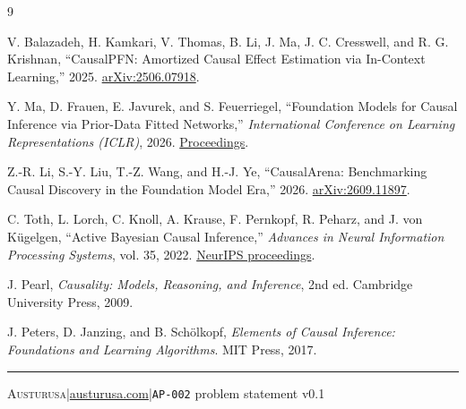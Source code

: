 \documentclass[11pt]{article}
\newcommand{\Austurusa}{\textsc{Austurusa}}
\newcommand{\codeid}[1]{\texttt{#1}}
\begin{document}
\begin{thebibliography}{9}

V. Balazadeh, H. Kamkari, V. Thomas, B. Li, J. Ma, J. C. Cresswell, and R. G. Krishnan,
``CausalPFN: Amortized Causal Effect Estimation via In-Context Learning,'' 2025.
\href{https://arxiv.org/abs/2506.07918}{arXiv:2506.07918}.

Y. Ma, D. Frauen, E. Javurek, and S. Feuerriegel,
``Foundation Models for Causal Inference via Prior-Data Fitted Networks,''
\emph{International Conference on Learning Representations (ICLR)}, 2026.
\href{https://proceedings.iclr.cc/paper_files/paper/2026/hash/7f8cabaf2de70e1a9d3eb187f02bd58c-Abstract-Conference.html}{Proceedings}.

Z.-R. Li, S.-Y. Liu, T.-Z. Wang, and H.-J. Ye,
``CausalArena: Benchmarking Causal Discovery in the Foundation Model Era,'' 2026.
\href{https://arxiv.org/abs/2609.11897}{arXiv:2609.11897}.

C. Toth, L. Lorch, C. Knoll, A. Krause, F. Pernkopf, R. Peharz, and J. von K\"ugelgen,
``Active Bayesian Causal Inference,''
\emph{Advances in Neural Information Processing Systems}, vol. 35, 2022.
\href{https://papers.nips.cc/paper_files/paper/2022/hash/675e371eeeea99551ce47797ed6ed33e-Abstract-Conference.html}{NeurIPS proceedings}.

J. Pearl,
\emph{Causality: Models, Reasoning, and Inference}, 2nd ed.
Cambridge University Press, 2009.

J. Peters, D. Janzing, and B. Sch\"olkopf,
\emph{Elements of Causal Inference: Foundations and Learning Algorithms}.
MIT Press, 2017.

\end{thebibliography}

\vfill
\rule{\textwidth}{0.4pt}
{\small\color{muted}
\Austurusa\quad |\quad \href{https://www.austurusa.com}{austurusa.com}\quad |\quad \codeid{AP-002} problem statement v0.1
}
\end{document}
